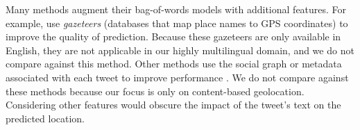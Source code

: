 \documentclass[sigconf,anonymous,review]{acmart}
\newcommand{\defn}[1]{\textit{#1}}
\newcommand{\fixme}[1]{\textcolor{red}{\textbf{FIXME:} {#1}}}
\begin{document}
\begin{description}
Many methods augment their bag-of-words models with additional features.
For example, \citet{zhang2014geocoding} use \defn{gazeteers} 
(databases that map place names to GPS coordinates) to improve the quality of prediction. 
Because these gazeteers are only available in English,
they are not applicable in our highly multilingual domain,
and we do not compare against this method.
Other methods use the social graph or metadata associated with each tweet to improve performance \citep[e.g.][]{hecht2011tweets,schulz2013multi,han2014text}.
We do not compare against these methods because our focus is only on content-based geolocation.
Considering other features would obscure the impact of the tweet's text on the predicted location.


%


\end{description}
\end{document}
